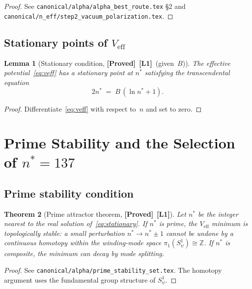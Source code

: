 \documentclass[12pt,a4paper]{article}
\newtheorem{theorem}{Theorem}[section]
\newtheorem{lemma}[theorem]{Lemma}
\theoremstyle{definition}
\theoremstyle{remark}
\newcommand{\PROVED}{\textbf{[Proved]}}
\newcommand{\Lone}{\textbf{[L1]}}
\newcommand{\ZZ}{\mathbb{Z}}
\begin{document}
\begin{proof}
See \texttt{canonical/alpha/alpha\_best\_route.tex} §2 and
\texttt{canonical/n\_eff/step2\_vacuum\_polarization.tex}.
\end{proof}

\subsection{Stationary points of $V_{\mathrm{eff}}$}

\begin{lemma}[Stationary condition, \PROVED\ \Lone\ (given~$B$)]
\label{lem:stationary}
The effective potential~\eqref{eq:veff} has a stationary point at $n^*$
satisfying the transcendental equation
\begin{equation}
\label{eq:stationary}
  2n^* \;=\; B\,(\ln n^* + 1).
\end{equation}
\end{lemma}

\begin{proof}
Differentiate~\eqref{eq:veff} with respect to~$n$ and set to zero.
\end{proof}

\section{Prime Stability and the Selection of $n^* = 137$}
\label{sec:prime}

\subsection{Prime stability condition}

\begin{theorem}[Prime attractor theorem, \PROVED\ \Lone]
\label{thm:prime}
Let $n^*$ be the integer nearest to the real solution of~\eqref{eq:stationary}.
If $n^*$ is prime, the $V_{\mathrm{eff}}$ minimum is topologically stable:
a small perturbation $n^* \to n^* \pm 1$ cannot be undone by a continuous
homotopy within the winding-mode space $\pi_1(S^1_\psi) \cong \ZZ$.
If $n^*$ is composite, the minimum can decay by mode splitting.
\end{theorem}

\begin{proof}
See \texttt{canonical/alpha/prime\_stability\_set.tex}.
The homotopy argument uses the fundamental group structure of $S^1_\psi$.
\end{proof}
\end{document}
